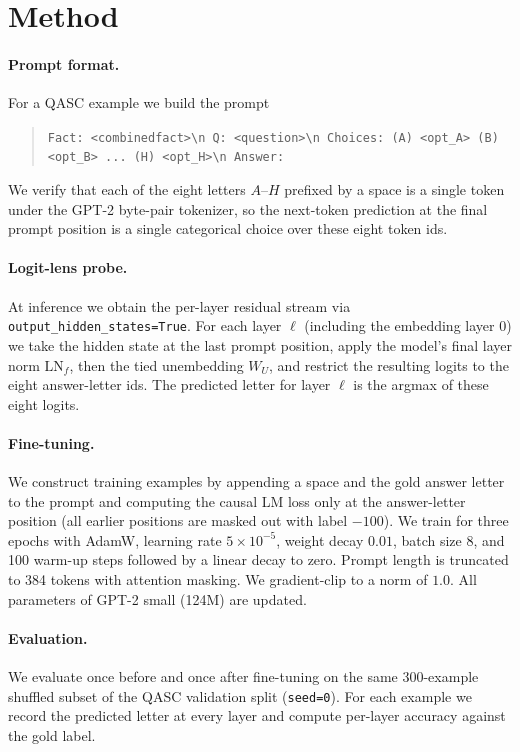 \documentclass[11pt]{article}
\begin{document}
\section{Method}
\label{sec:method}

\paragraph{Prompt format.} For a QASC example we build the prompt
\begin{quote}\small
\texttt{Fact: <combinedfact>\textbackslash n Q: <question>\textbackslash n Choices: (A) <opt\_A> (B) <opt\_B> ... (H) <opt\_H>\textbackslash n Answer: }
\end{quote}
We verify that each of the eight letters $A$--$H$ prefixed by a space is a
single token under the GPT-2 byte-pair tokenizer, so the next-token prediction
at the final prompt position is a single categorical choice over these eight
token ids.

\paragraph{Logit-lens probe.} At inference we obtain the per-layer residual
stream via \texttt{output\_hidden\_states=True}. For each layer $\ell$
(including the embedding layer 0) we take the hidden state at the last prompt
position, apply the model's final layer norm $\mathrm{LN}_f$, then the tied
unembedding $W_U$, and restrict the resulting logits to the eight answer-letter
ids. The predicted letter for layer $\ell$ is the argmax of these eight
logits.

\paragraph{Fine-tuning.} We construct training examples by appending a space
and the gold answer letter to the prompt and computing the causal LM loss only
at the answer-letter position (all earlier positions are masked out with label
$-100$). We train for three epochs with AdamW, learning rate $5\times10^{-5}$,
weight decay $0.01$, batch size $8$, and 100 warm-up steps followed by a
linear decay to zero. Prompt length is truncated to 384 tokens with attention
masking. We gradient-clip to a norm of $1.0$. All parameters of GPT-2 small
(124M) are updated.

\paragraph{Evaluation.} We evaluate once before and once after fine-tuning on
the same 300-example shuffled subset of the QASC validation split
(\texttt{seed=0}). For each example we record the predicted letter at every
layer and compute per-layer accuracy against the gold label.
\end{document}
